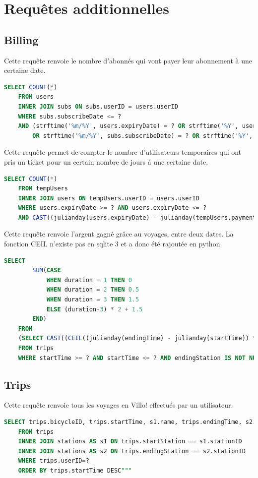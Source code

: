 \documentclass[a4paper,11pt]{report}
\begin{document}
\chapter{Requ\^etes additionnelles}

    \section{Billing}
    Cette requ\^ete renvoie le nombre d'abonnés qui vont payer leur abonnement à une certaine date.
    \begin{lstlisting}[language=sql]
    SELECT COUNT(*) 
    FROM users
    INNER JOIN subs ON subs.userID = users.userID
    WHERE subs.subscribeDate <= ?
    AND (strftime('%m/%Y', users.expiryDate) = ? OR strftime('%Y', users.expiryDate) = ?) 
        OR strftime('%m/%Y', subs.subscribeDate) = ? OR strftime('%Y', subs.subscribeDate) = ?
    \end{lstlisting}

    Cette requ\^ete permet de compter le nombre d'utilisateurs temporaires qui ont pris un ticket pour un certain nombre de jours à une certaine date.
    \begin{lstlisting}[language=sql]
    SELECT COUNT(*)
    FROM tempUsers
    INNER JOIN users ON tempUsers.userID = users.userID
    WHERE users.expiryDate >= ? AND users.expiryDate <= ?
    AND CAST((julianday(users.expiryDate) - julianday(tempUsers.paymentDate)) AS INTEGER) == ?
    \end{lstlisting}

    Cette requ\^ete renvoie l'argent gagné gr\^ace au voyages, entre deux dates.
    La fonction CEIL n'existe pas en sqlite 3 et a donc été rajoutée en python.
    \begin{lstlisting}[language=sql]
    SELECT
        SUM(CASE 
            WHEN duration = 1 THEN 0 
            WHEN duration = 2 THEN 0.5 
            WHEN duration = 3 THEN 1.5 
            ELSE (duration-3) * 2 + 1.5 
        END)
    FROM 
    (SELECT CAST((CEIL((julianday(endingTime) - julianday(startTime)) * 48.0)) AS INTEGER) AS duration
    FROM trips
    WHERE startTime >= ? AND startTime <= ? AND endingStation IS NOT NULL AND endingTime IS NOT NULL)
    \end{lstlisting}

    \section{Trips}
    Cette requ\^ete renvoie tous les voyages en Villo! effectués par un utilisateur.
    \begin{lstlisting}[language=sql]
    SELECT trips.bicycleID, trips.startTime, s1.name, trips.endingTime, s2.name
    FROM trips
    INNER JOIN stations AS s1 ON trips.startStation == s1.stationID
    INNER JOIN stations AS s2 ON trips.endingStation == s2.stationID
    WHERE trips.userID=?
    ORDER BY trips.startTime DESC"""
    \end{lstlisting}
\end{document}
